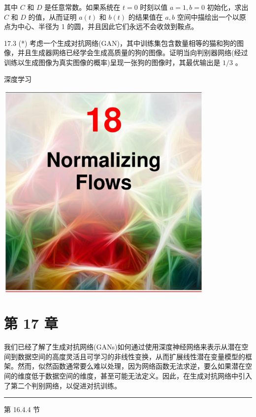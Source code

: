 \documentclass[10pt]{article}
\newcommand{\HRule}{\begin{center}\rule{0.9\linewidth}{0.2mm}\end{center}}
\begin{document}
其中 \(C\) 和 \(D\) 是任意常数。如果系统在 \(t = 0\) 时刻以值 \(a = 1,b = 0\) 初始化，求出 \(C\) 和 \(D\) 的值，从而证明 \(a\left( t\right)\) 和 \(b\left( t\right)\) 的结果值在 \(a,b\) 空间中描绘出一个以原点为中心、半径为 1 的圆，并且因此它们永远不会收敛到鞍点。

17.3 (*) 考虑一个生成对抗网络(GAN)，其中训练集包含数量相等的猫和狗的图像，并且生成器网络已经学会生成高质量的狗的图像。证明当向判别器网络(经过训练以生成图像为真实图像的概率)呈现一张狗的图像时，其最优输出是 \(1/3\) 。

深度学习

\begin{center}
\includegraphics[max width=0.8\textwidth]{images/0194e279-9b28-703a-88f4-c3ac21e2010d_566_473_348_1076_1089_0.jpg}
\end{center}
\hspace*{3em} 

\section*{第 17 章}

我们已经了解了生成对抗网络(GANs)如何通过使用深度神经网络来表示从潜在空间到数据空间的高度灵活且可学习的非线性变换，从而扩展线性潜在变量模型的框架。然而，似然函数通常要么难以处理，因为网络函数无法求逆，要么如果潜在空间的维度低于数据空间的维度，甚至可能无法定义。因此，在生成对抗网络中引入了第二个判别网络，以促进对抗训练。

\HRule

第 16.4.4 节
\end{document}
